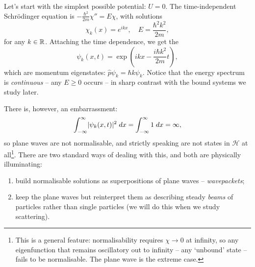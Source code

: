 \documentclass[a4paper]{scrartcl}
\begin{document}
Let's start with the simplest possible potential: $U = 0$. The time-independent Schr\"odinger equation is $-\frac{\hbar^2}{2m}\chi'' = E \chi$, with solutions
$$
\chi_k(x) = e^{ikx}, \quad E = \frac{\hbar^2 k^2}{2m},
$$
for any $k \in \mathbb{R}$. Attaching the time dependence, we get the 
$$
\psi_k(x, t) = \exp\left(i k x - \frac{i\hbar k^2}{2m} t\right),
$$
which are momentum eigenstates: $\hat{p} \psi_k = \hbar k \psi_k$. Notice that the energy spectrum is \emph{continuous} -- any $E \geq 0$ occurs -- in sharp contrast with the bound systems we study later.

There is, however, an embarrassment:
$$
\int_{-\infty}^{\infty} \lvert\psi_k(x,t)\rvert^2 \; d x = \int_{-\infty}^{\infty} 1 \; d x = \infty,
$$
so plane waves are not normalisable, and strictly speaking are not states in $\mathcal{H}$ at all\footnote{This is a general feature: normalisability requires $\chi \rightarrow 0$ at infinity, so any eigenfunction that remains oscillatory out to infinity -- any `unbound' state -- fails to be normalisable. The plane wave is the extreme case.}. There are two standard ways of dealing with this, and both are physically illuminating:
\begin{enumerate}[label=(\roman*)]
    \item build normalisable solutions as superpositions of plane waves -- \emph{wavepackets};
    \item keep the plane waves but reinterpret them as describing steady \emph{beams} of particles rather than single particles (we will do this when we study scattering).
\end{enumerate}
\end{document}
